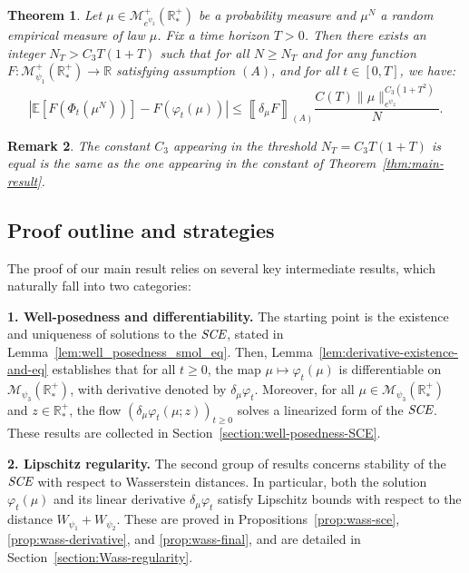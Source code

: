 \documentclass[11pt,a4paper]{article}
\newcommand{\RR}{\mathbb{R}}
\newcommand{\RRP}{\mathbb{R}^+_*}
\newcommand{\MC}{\mathcal{M}}
\newcommand{\SCE}{\emph{SCE}}
\newcommand{\A}{(A)}
\newcommand{\Proc}[1]{\left(#1\right)_{t\geq 0}}
\newtheorem{theorem}{Theorem}[section]
\newtheorem{remark}[theorem]{Remark}
\begin{document}
\begin{theorem}\label{thm:main-result-2}
    Let $\mu \in \MC^+_{e^{\psi_2}}(\RRP)$ be a probability measure and $\mu^N$ a \emph{random} empirical measure of law $\mu$. Fix a time horizon $T > 0$. Then there exists an integer $N_T > C_3 T(1 + T)$ such that for all $N \geq N_T$ and for any function \(F : \MC^+_{\psi_1}(\RRP) \to \RR\) satisfying assumption \(\A\), and for all \(t \in [0, T]\), we have:
    \[
    \left| \mathbb{E}\left[F\left(\Phi_t\left(\mu^N\right)\right)\right] - F\left(\varphi_t(\mu)\right) \right| \leq \left\llbracket \delta_\mu F \right\rrbracket_{\A}  \frac{C(T) \|\mu\|_{e^{\psi_2}}^{C_3 (1 + T^2)}}{N}.
    \]
\end{theorem}

\begin{remark}
    The constant $C_3$ appearing in the threshold $N_T = C_3T(1 + T)$ is equal is the same as the one appearing in the constant of Theorem~\ref{thm:main-result}.
\end{remark}


\subsection{Proof outline and strategies}
The proof of our main result relies on several key intermediate results, which naturally fall into two categories:

\textbf{1. Well-posedness and differentiability.} The starting point is the existence and uniqueness of solutions to the $\SCE$, stated in Lemma~\ref{lem:well_posedness_smol_eq}. Then, Lemma~\ref{lem:derivative-existence-and-eq} establishes that for all $t \geq 0$, the map $\mu \mapsto \varphi_t(\mu)$ is differentiable on $\MC_{\psi_3}(\RRP)$, with derivative denoted by $\delta_\mu \varphi_t$. Moreover, for all $\mu \in \MC_{\psi_3}(\RRP)$ and $z \in \RRP$, the flow $\Proc{\delta_\mu \varphi_t(\mu;z)}$ solves a linearized form of the $\SCE$. These results are collected in Section~\ref{section:well-posedness-SCE}.

\textbf{2. Lipschitz regularity.} The second group of results concerns stability of the $\SCE$ with respect to Wasserstein distances. In particular, both the solution $\varphi_t(\mu)$ and its linear derivative $\delta_\mu \varphi_t$ satisfy Lipschitz bounds with respect to the distance $W_{\psi_1} + W_{\psi_2}$. These are proved in Propositions~\ref{prop:wass-sce}, \ref{prop:wass-derivative}, and \ref{prop:wass-final}, and are detailed in Section~\ref{section:Wass-regularity}.
\end{document}
